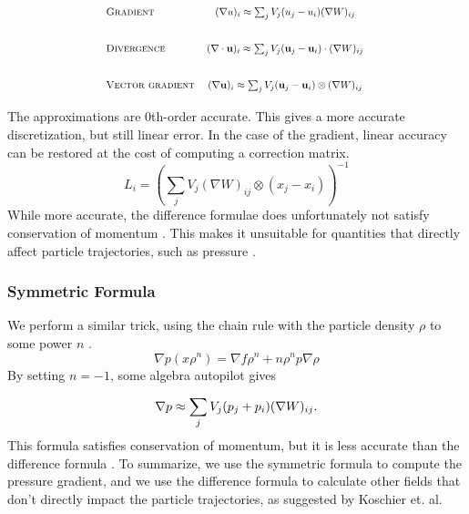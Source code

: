 \begin{equation}
    \label{eq:difference-formula}
    \def\arraystretch{3}
    \scalebox{.8}{%
        \begin{tabular}{lc}
            \sc Gradient & $
            (\nabla u)_i \approx
            \sum_j V_j (u_j - u_i) (\nabla W)_{ij} $ \\
            \sc Divergence & $
            (\nabla \cdot \vec u)_i \approx
            \sum_j V_j (\vec u_j - \vec u_i) \cdot (\nabla W)_{ij} $ \\
            \sc Vector gradient & $
            (\nabla \vec u)_i \approx
            \sum_j V_j (\vec u_j - \vec u_i) \otimes (\nabla W)_{ij} $
        \end{tabular}
        }
\end{equation}
The approximations are 0th-order accurate.
\cite{sph_techniques}
This gives a more accurate discretization, but still linear error.
In the case of the gradient, linear accuracy can be restored at the 
cost of computing a correction matrix.
\cite{sph_techniques,icsph}
\begin{equation}
    \label{eq:correction-matrix}
    L_i = \left( \sum_j V_j (\nabla W)_{ij} \otimes (x_j - x_i) \right)^{-1}
\end{equation}
While more accurate, the difference formulae does unfortunately not
satisfy conservation of momentum \cite{sph_techniques}.
This makes it unsuitable for quantities that directly affect particle
trajectories, such as pressure \cite{sph_techniques, icsph}.


\subsubsection{Symmetric Formula}
We perform a similar trick, using the chain rule with the particle
density $\rho$ to some power $n$ \cite{monaghan05}.
$$
\nabla p(x \rho^n) = \nabla f \rho^n + n \rho^n p \nabla \rho
$$
By setting $n = -1$, some algebra autopilot gives

\begin{equation}
    \label{eq:pressure-grad}
    \nabla p \approx \sum_j V_j (p_j + p_i) (\nabla W)_{ij} \text.
\end{equation}
This formula satisfies conservation of momentum, but it is
less accurate than the difference formula \cite{sph_techniques}.
To summarize, we use the symmetric formula to compute the pressure
gradient, and we use the difference formula to calculate other
fields that don't directly impact the particle trajectories,
as suggested by Koschier et. al.


